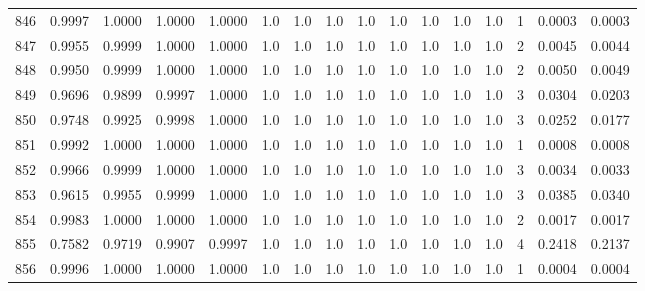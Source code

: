\begin{tabular}{lrrrrrrrrrrrrrrr}
846 &      0.9997 &  1.0000 &  1.0000 &  1.0000 &     1.0 &     1.0 &     1.0 &     1.0 &     1.0 &     1.0 &      1.0 &        1.0 &      1 &                    0.0003 &                     0.0003 \\
847 &      0.9955 &  0.9999 &  1.0000 &  1.0000 &     1.0 &     1.0 &     1.0 &     1.0 &     1.0 &     1.0 &      1.0 &        1.0 &      2 &                    0.0045 &                     0.0044 \\
848 &      0.9950 &  0.9999 &  1.0000 &  1.0000 &     1.0 &     1.0 &     1.0 &     1.0 &     1.0 &     1.0 &      1.0 &        1.0 &      2 &                    0.0050 &                     0.0049 \\
849 &      0.9696 &  0.9899 &  0.9997 &  1.0000 &     1.0 &     1.0 &     1.0 &     1.0 &     1.0 &     1.0 &      1.0 &        1.0 &      3 &                    0.0304 &                     0.0203 \\
850 &      0.9748 &  0.9925 &  0.9998 &  1.0000 &     1.0 &     1.0 &     1.0 &     1.0 &     1.0 &     1.0 &      1.0 &        1.0 &      3 &                    0.0252 &                     0.0177 \\
851 &      0.9992 &  1.0000 &  1.0000 &  1.0000 &     1.0 &     1.0 &     1.0 &     1.0 &     1.0 &     1.0 &      1.0 &        1.0 &      1 &                    0.0008 &                     0.0008 \\
852 &      0.9966 &  0.9999 &  1.0000 &  1.0000 &     1.0 &     1.0 &     1.0 &     1.0 &     1.0 &     1.0 &      1.0 &        1.0 &      3 &                    0.0034 &                     0.0033 \\
853 &      0.9615 &  0.9955 &  0.9999 &  1.0000 &     1.0 &     1.0 &     1.0 &     1.0 &     1.0 &     1.0 &      1.0 &        1.0 &      3 &                    0.0385 &                     0.0340 \\
854 &      0.9983 &  1.0000 &  1.0000 &  1.0000 &     1.0 &     1.0 &     1.0 &     1.0 &     1.0 &     1.0 &      1.0 &        1.0 &      2 &                    0.0017 &                     0.0017 \\
855 &      0.7582 &  0.9719 &  0.9907 &  0.9997 &     1.0 &     1.0 &     1.0 &     1.0 &     1.0 &     1.0 &      1.0 &        1.0 &      4 &                    0.2418 &                     0.2137 \\
856 &      0.9996 &  1.0000 &  1.0000 &  1.0000 &     1.0 &     1.0 &     1.0 &     1.0 &     1.0 &     1.0 &      1.0 &        1.0 &      1 &                    0.0004 &                     0.0004 \\

\end{tabular}
